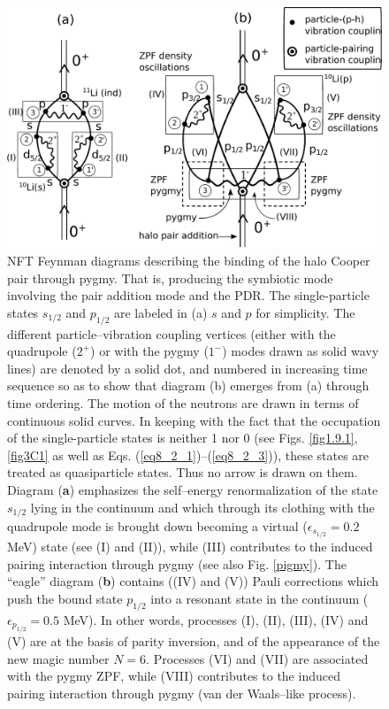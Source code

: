    \begin{figure}[h!]
   \centerline{\includegraphics*[width=17cm,angle=0]{nutshell/figs/VdW.pdf}}\caption{NFT Feynman diagrams describing the binding of the halo Cooper pair through pygmy. That is, producing the symbiotic mode involving the pair addition mode and the PDR. The single-particle states $s_{1/2}$ and $p_{1/2}$ are labeled in (a) $s$ and $p$ for simplicity. The different particle--vibration coupling vertices (either with the quadrupole ($2^+$) or with the pygmy ($1^-$) modes drawn as solid wavy lines) are denoted by a solid dot, and numbered in increasing time sequence so as to show that diagram (b) emerges from (a) through time ordering. The motion of the neutrons are drawn in terms of continuous solid curves. In keeping with the fact that the occupation of the single-particle states is neither 1 nor 0 (see Figs. \ref{fig1.9.1}, \ref{fig3C1} as well as  Eqs. (\ref{eq8_2_1})--(\ref{eq8_2_3})), these states are treated as quasiparticle states. Thus no arrow is drawn on them. Diagram (\textbf{a}) emphasizes the self--energy renormalization of the state $s_{1/2}$ lying in the continuum and which   through its clothing with the quadrupole mode is brought down becoming a virtual ($\epsilon_{s_{1/2}}=0.2$ MeV) state (see (I) and (II)), while (III) contributes to the induced pairing interaction through pygmy (see also Fig. \ref{pigmy}). The ``eagle'' diagram (\textbf{b}) contains ((IV) and (V)) Pauli corrections which push the bound state $p_{1/2}$ into a resonant state in the continuum ($\epsilon_{p_{1/2}}=0.5$ MeV). In other words, processes (I), (II), (III), (IV) and (V) are at the basis of parity inversion, and of the appearance of the new magic number $N=6$. Processes (VI) and (VII) are associated with the pygmy ZPF, while (VIII) contributes to the induced pairing interaction through pygmy (van der Waals--like process).}\label{fig2.A.1}
   \end{figure}
 
